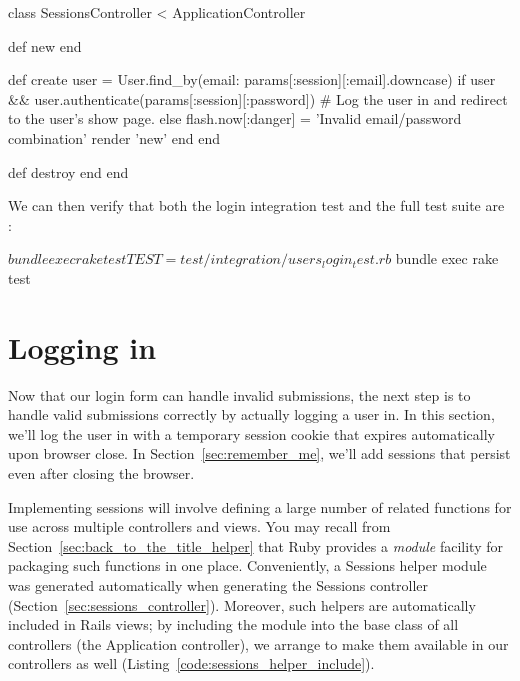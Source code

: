 \begin{codelisting}
\label{code:correct_login_failure}
\begin{code}
class SessionsController < ApplicationController

  def new
  end

  def create
    user = User.find_by(email: params[:session][:email].downcase)
    if user && user.authenticate(params[:session][:password])
      # Log the user in and redirect to the user's show page.
    else
      flash.now[:danger] = 'Invalid email/password combination'
      render 'new'
    end
  end

  def destroy
  end
end
\end{code}
\end{codelisting}

We can then verify that both the login integration test and the full test suite are \passing:

\begin{codelisting}
\codecaption{\passing}
\begin{code}
$ bundle exec rake test TEST=test/integration/users_login_test.rb
$ bundle exec rake test
\end{code}
\end{codelisting}



  \section{Logging in} %
  \label{sec:logging_in}

Now that our login form can handle invalid submissions, the next step is to handle valid submissions correctly by actually logging a user in. In this section, we'll log the user in with a temporary session cookie that expires automatically upon browser close. In Section~\ref{sec:remember_me}, we'll add sessions that persist even after closing the browser.

Implementing sessions will involve defining a large number of related functions for use across multiple controllers and views. You may recall from Section~\ref{sec:back_to_the_title_helper} that Ruby provides a \emph{module} facility for packaging such functions in one place. Conveniently, a Sessions helper module was generated automatically when generating the Sessions controller (Section~\ref{sec:sessions_controller}). Moreover, such helpers are automatically included in Rails views; by including the module into the base class of all controllers (the Application controller), we arrange to make them available in our controllers as well (Listing~\ref{code:sessions_helper_include}).

